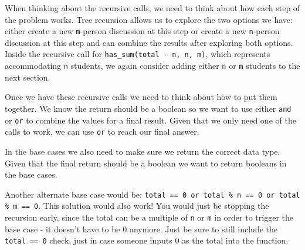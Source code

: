     \begin{solution}
    \begin{blocksection}
    When thinking about the recursive calls, we need to think about how each step of the problem works. Tree recursion allows us to explore the two options we have: 
    either create a new \lstinline{m}-person discussion at this step or create a new \lstinline{n}-person discussion at this step and can combine the results after exploring both options. 
    Inside the recursive call for \lstinline{has_sum(total - n, n, m)}, which represents accommodating \lstinline{n} students, we again consider adding either
    \lstinline{n} or \lstinline{m} students to the next section.
    
    Once we have these recursive calls we need to think about how to put them together. We know the return should be a boolean so we want to use either \lstinline{and} or \lstinline{or} to combine the values for a final result. Given that we only need one of the calls to work, we can use \lstinline{or} to reach our final answer.
    
    In the base cases we also need to make sure we return the correct data type. Given that the final return should be a boolean we want to return booleans in the base cases.
    
    Another alternate base case would be: \lstinline{total == 0 or total % n == 0 or total % m == 0}. This solution would also work! You would just be stopping the recursion early, since the total can be a multiple of \lstinline{n} or \lstinline{m} in order to trigger the base case - it doesn’t have to be 0 anymore. Just be sure to still include the \lstinline{total == 0} check, just in case someone inputs 0 as the total into the function.
    \end{blocksection}
    \end{solution}
    
